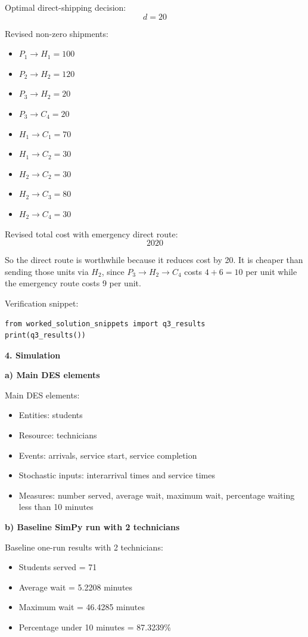 \documentclass[11pt,a4paper]{article}
\begin{document}
Optimal direct-shipping decision:
\[
d = 20
\]

Revised non-zero shipments:
\begin{itemize}
\item $P_1 \to H_1 = 100$
\item $P_2 \to H_2 = 120$
\item $P_3 \to H_2 = 20$
\item $P_3 \to C_4 = 20$
\item $H_1 \to C_1 = 70$
\item $H_1 \to C_2 = 30$
\item $H_2 \to C_2 = 30$
\item $H_2 \to C_3 = 80$
\item $H_2 \to C_4 = 30$
\end{itemize}

Revised total cost with emergency direct route:
\[
2020
\]

So the direct route is worthwhile because it reduces cost by 20. It is cheaper than sending those units via $H_2$, since $P_3 \to H_2 \to C_4$ costs $4 + 6 = 10$ per unit while the emergency route costs 9 per unit.

Verification snippet:
\begin{verbatim}
from worked_solution_snippets import q3_results
print(q3_results())
\end{verbatim}

\textbf{4. Simulation}

\textbf{a) Main DES elements}

Main DES elements:
\begin{itemize}
\item Entities: students
\item Resource: technicians
\item Events: arrivals, service start, service completion
\item Stochastic inputs: interarrival times and service times
\item Measures: number served, average wait, maximum wait, percentage waiting less than 10 minutes
\end{itemize}

\textbf{b) Baseline SimPy run with 2 technicians}

Baseline one-run results with 2 technicians:
\begin{itemize}
\item Students served = 71
\item Average wait = 5.2208 minutes
\item Maximum wait = 46.4285 minutes
\item Percentage under 10 minutes = 87.3239\%
\end{itemize}
\end{document}
